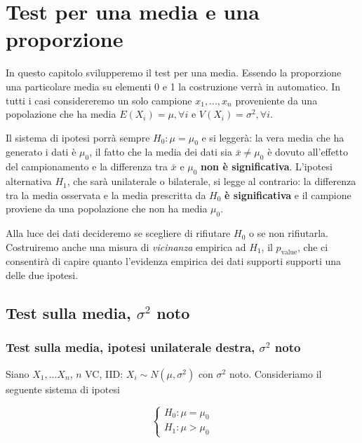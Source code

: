 \documentclass[
  11pt,
]{book}
\theoremstyle{mytheoremstyle}
\theoremstyle{mydefstyle}
\begin{document}
\chapter{Test per una media e una proporzione}\label{test-per-una-media-e-una-proporzione}

In questo capitolo svilupperemo il test per una media. Essendo la
proporzione una particolare media su elementi 0 e 1 la costruzione verrà
in automatico. In tutti i casi considereremo un solo campione
\(x_1,...,x_n\) proveniente da una popolazione che ha media
\(E(X_i)=\mu, \forall i\) e \(V(X_i)=\sigma^2, \forall i\).

Il sistema di ipotesi porrà sempre \(H_0:\mu=\mu_0\) e si leggerà: la vera
media che ha generato i dati è \(\mu_0\), il fatto che la media dei dati
sia \(\bar x\ne\mu_0\) è dovuto all'effetto del campionamento e la
differenza tra \(\bar x\) e \(\mu_0\) \textbf{non è significativa}. L'ipotesi
alternativa \(H_1\), che sarà unilaterale o bilaterale, si legge al
contrario: la differenza tra la media osservata e la media prescritta da
\(H_0\) \textbf{è significativa} e il campione proviene da una popolazione che
non ha media \(\mu_0\).

Alla luce dei dati decideremo se scegliere di rifiutare \(H_0\) o se non
rifiutarla. Costruiremo anche una misura di \emph{vicinanza} empirica ad
\(H_1\), il \(p_{\text{value}}\), che ci consentirà di capire quanto
l'evidenza empirica dei dati supporti supporti una delle due ipotesi.

\section{\texorpdfstring{Test sulla media, \(\sigma^2\) noto}{Test sulla media, \textbackslash sigma\^{}2 noto}}\label{test-sulla-media-sigma2-noto}

\subsection{\texorpdfstring{Test sulla media, ipotesi unilaterale destra, \(\sigma^2\) noto}{Test sulla media, ipotesi unilaterale destra, \textbackslash sigma\^{}2 noto}}\label{test-sulla-media-ipotesi-unilaterale-destra-sigma2-noto}

Siano \(X_1,...X_n\), \(n\) VC, IID: \(X_i\sim N(\mu,\sigma^2)\) con
\(\sigma^2\) noto. Consideriamo il seguente sistema di ipotesi

\[\begin{cases}
H_0:\mu=\mu_0\\
H_1:\mu>\mu_0
\end{cases}\]
\end{document}

